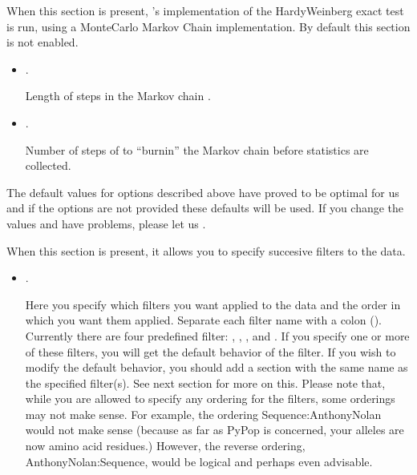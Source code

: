 \documentclass[letterpaper,10pt,english,openany,oneside]{sphinxmanual}
\begin{document}
\sphinxAtStartPar
When this section is present, ’s implementation of the
Hardy\sphinxhyphen{}Weinberg exact test is run, using a Monte\sphinxhyphen{}Carlo Markov Chain
implementation. By default this section is not enabled.
\begin{itemize}
\item {} 
\sphinxAtStartPar
{}.

\sphinxAtStartPar
Length of steps in the Markov chain \sphinxstylestrong{{[}Default: 2500000{]}}.

\item {} 
\sphinxAtStartPar
{}.

\sphinxAtStartPar
Number of steps of to “burn\sphinxhyphen{}in” the Markov chain before statistics
are collected.\sphinxstylestrong{{[}Default:}  \sphinxstylestrong{{]}}

\end{itemize}

\sphinxAtStartPar
The default values for options described above have proved to be optimal
for us and if the options are not provided these defaults will be used.
If you change the values and have problems, please let us .

\sphinxAtStartPar
\sphinxcode{\sphinxupquote{{[}Filters{]}}} 

\sphinxAtStartPar
When this section is present, it allows you to specify succesive filters
to the data.
\begin{itemize}
\item {} 
\sphinxAtStartPar
{}.

\sphinxAtStartPar
Here you specify which filters you want applied to the data and the
order in which you want them applied. Separate each filter name with
a colon (\sphinxcode{\sphinxupquote{:}}). Currently there are four predefined filter:
, , , and
. If you specify one or more of these filters, you
will get the default behavior of the filter. If you wish to modify
the default behavior, you should add a section with the same name as
the specified filter(s). See next section for more on this. Please
note that, while you are allowed to specify any ordering for the
filters, some orderings may not make sense. For example, the ordering
Sequence:AnthonyNolan would not make sense (because as far as PyPop
is concerned, your alleles are now amino acid residues.) However, the
reverse ordering, AnthonyNolan:Sequence, would be logical and perhaps
even advisable.

\end{itemize}
\end{document}
